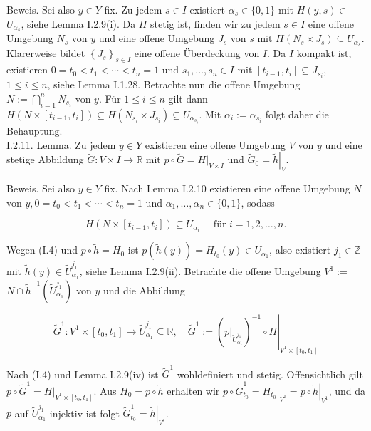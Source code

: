 \documentclass[10pt, letterpaper]{article}
\begin{document}
Beweis. Sei also $y \in Y$ fix. Zu jedem $s \in I$ existiert $\alpha_{s} \in\{0,1\}$ mit $H(y, s) \in$ $U_{\alpha_{s}}$, siehe Lemma I.2.9(i). Da $H$ stetig ist, finden wir zu jedem $s \in I$ eine offene Umgebung $N_{s}$ von $y$ und eine offene Umgebung $J_{s}$ von $s$ mit $H\left(N_{s} \times J_{s}\right) \subseteq U_{\alpha_{s}}$. Klarerweise bildet $\left\{J_{s}\right\}_{s \in I}$ eine offene Überdeckung von $I$. Da $I$ kompakt ist, existieren $0=t_{0}<t_{1}<\cdots<t_{n}=1$ und $s_{1}, \ldots, s_{n} \in I$ mit $\left[t_{i-1}, t_{i}\right] \subseteq J_{s_{i}}$, $1 \leq i \leq n$, siehe Lemma I.1.28. Betrachte nun die offene Umgebung $N:=\bigcap_{i=1}^{n} N_{s_{i}}$ von $y$. Für $1 \leq i \leq n$ gilt dann $H\left(N \times\left[t_{i-1}, t_{i}\right]\right) \subseteq H\left(N_{s_{i}} \times J_{s_{i}}\right) \subseteq U_{\alpha_{s_{i}}}$. Mit $\alpha_{i}:=\alpha_{s_{i}}$ folgt daher die Behauptung.\\
I.2.11. Lemma. Zu jedem $y \in Y$ existieren eine offene Umgebung $V$ von $y$ und eine stetige Abbildung $\tilde{G}: V \times I \rightarrow \mathbb{R}$ mit $p \circ \tilde{G}=\left.H\right|_{V \times I}$ und $\tilde{G}_{0}=\left.\tilde{h}\right|_{V}$.

Beweis. Sei also $y \in Y$ fix. Nach Lemma I.2.10 existieren eine offene Umgebung $N$ von $y, 0=t_{0}<t_{1}<\cdots<t_{n}=1$ und $\alpha_{1}, \ldots, \alpha_{n} \in\{0,1\}$, sodass

$$
H\left(N \times\left[t_{i-1}, t_{i}\right]\right) \subseteq U_{\alpha_{i}} \quad \text { für } i=1,2, \ldots, n .
$$

Wegen (I.4) und $p \circ \tilde{h}=H_{0}$ ist $p(\tilde{h}(y))=H_{t_{0}}(y) \in U_{\alpha_{1}}$, also existiert $j_{1} \in \mathbb{Z}$ mit $\tilde{h}(y) \in \tilde{U}_{\alpha_{1}}^{j_{1}}$, siehe Lemma I.2.9(ii). Betrachte die offene Umgebung $V^{1}:=$ $N \cap \tilde{h}^{-1}\left(\tilde{U}_{\alpha_{1}}^{j_{1}}\right)$ von $y$ und die Abbildung

$$
\tilde{G}^{1}: V^{1} \times\left[t_{0}, t_{1}\right] \rightarrow \tilde{U}_{\alpha_{1}}^{j_{1}} \subseteq \mathbb{R}, \quad \tilde{G}^{1}:=\left.\left(\left.p\right|_{\tilde{U}_{\alpha_{1}}^{j_{1}}}\right)^{-1} \circ H\right|_{V^{1} \times\left[t_{0}, t_{1}\right]}
$$

Nach (I.4) und Lemma I.2.9(iv) ist $\tilde{G}^{1}$ wohldefiniert und stetig. Offensichtlich gilt $p \circ \tilde{G}^{1}=\left.H\right|_{V^{1} \times\left[t_{0}, t_{1}\right]}$. Aus $H_{0}=p \circ \tilde{h}$ erhalten wir $p \circ \tilde{G}_{t_{0}}^{1}=\left.H_{t_{0}}\right|_{V^{1}}=\left.p \circ \tilde{h}\right|_{V^{1}}$, und da $p$ auf $\tilde{U}_{\alpha_{1}}^{j_{1}}$ injektiv ist folgt $\tilde{G}_{t_{0}}^{1}=\left.\tilde{h}\right|_{V^{1}}$.
\end{document}
